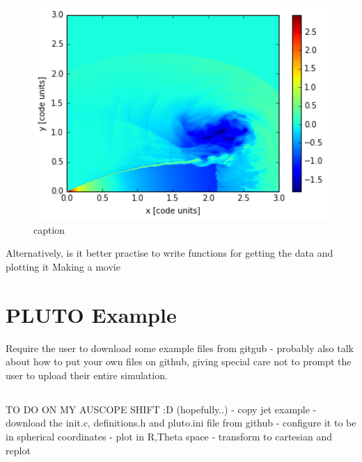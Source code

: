 \documentclass[12pt]{article}
\begin{document}
\begin{figure}[!h]
	\includegraphics[width=15cm]{examplesim}
	\centering
	\caption{caption}
\end{figure}


Alternatively, is it better practise to write functions for getting the data and plotting it
Making a movie

\section{PLUTO Example}
Require the user to download some example files from gitgub
- probably also talk about how to put your own files on github, giving special care not to prompt the user to upload their entire simulation.


\subsection{}

TO DO ON MY AUSCOPE SHIFT :D (hopefully..)
- copy jet example
- download the init.c, definitions.h and pluto.ini file from github
- configure it to be in spherical coordinates
- plot in R,Theta space
- transform to cartesian and replot
\end{document}

